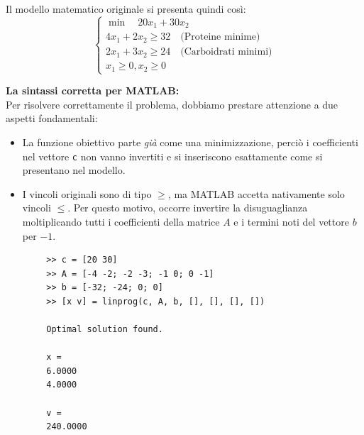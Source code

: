 \documentclass[12pt, a4paper]{article}
\begin{document}
	Il modello matematico originale si presenta quindi così:
	\[
	\begin{cases}
		\min \quad 20x_1 + 30x_2 \\
		4x_1 + 2x_2 \geq 32 \quad \text{(Proteine minime)} \\
		2x_1 + 3x_2 \geq 24 \quad \text{(Carboidrati minimi)} \\
		x_1 \geq 0, x_2 \geq 0
	\end{cases}
	\]
	
	\textbf{La sintassi corretta per MATLAB:}\\
	Per risolvere correttamente il problema, dobbiamo prestare attenzione a due aspetti fondamentali:
	\begin{itemize}
		\item La funzione obiettivo parte \textit{già} come una minimizzazione, perciò i coefficienti nel vettore \texttt{c} non vanno invertiti e si inseriscono esattamente come si presentano nel modello.
		\item I vincoli originali sono di tipo $\geq$, ma MATLAB accetta nativamente solo vincoli $\leq$. Per questo motivo, occorre invertire la disuguaglianza moltiplicando tutti i coefficienti della matrice $A$ e i termini noti del vettore $b$ per $-1$.
	\end{itemize}
	
	\begin{verbatim}
		>> c = [20 30]
		>> A = [-4 -2; -2 -3; -1 0; 0 -1]
		>> b = [-32; -24; 0; 0]
		>> [x v] = linprog(c, A, b, [], [], [], [])
		
		Optimal solution found.
		
		x =
		6.0000
		4.0000
		
		v =
		240.0000
	\end{verbatim}
	
\end{document}
